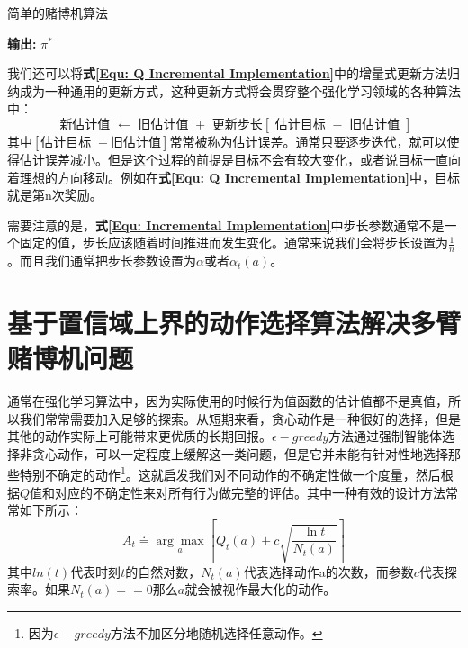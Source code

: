\begin{algorithm}[h]
	\caption{简单的赌博机算法}
	\label{alg: A simple bandit algorithm}
	\begin{algorithmic}[1]
	    \ENDFOR
		
		\ENDWHILE
	\end{algorithmic}
	\hspace*{0.02in} {\bf 输出:} $\pi^{*}$
\end{algorithm}

我们还可以将\textbf{式\eqref{Equ: Q Incremental Implementation}}中的增量式更新方法归纳成为一种通用的更新方式，这种更新方式将会贯穿整个强化学习领域的各种算法中：
\begin{equation}
\label{Equ: Incremental Implementation}
    \text { 新估计值 } \leftarrow \text { 旧估计值 }+\text { 更新步长}[\text { 估计目标 }-\text { 旧估计值 }]
\end{equation}
其中$[\text {估计目标 }-\text {旧估计值}]$常常被称为估计误差。通常只要逐步迭代，就可以使得估计误差减小。但是这个过程的前提是目标不会有较大变化，或者说目标一直向着理想的方向移动。例如在\textbf{式\eqref{Equ: Q Incremental Implementation}}中，目标就是第n次奖励。

需要注意的是，\textbf{式\eqref{Equ: Incremental Implementation}}中步长参数通常不是一个固定的值，步长应该随着时间推进而发生变化。通常来说我们会将步长设置为$\frac{1}{n}$。而且我们通常把步长参数设置为$\alpha$或者$\alpha_{t}(a)$。

\section{基于置信域上界的动作选择算法解决多臂赌博机问题}
通常在强化学习算法中，因为实际使用的时候行为值函数的估计值都不是真值，所以我们常常需要加入足够的探索。从短期来看，贪心动作是一种很好的选择，但是其他的动作实际上可能带来更优质的长期回报。$\epsilon-greedy$方法通过强制智能体选择非贪心动作，可以一定程度上缓解这一类问题，但是它并未能有针对性地选择那些特别不确定的动作\footnote{因为$\epsilon-greedy$方法不加区分地随机选择任意动作。}。这就启发我们对不同动作的不确定性做一个度量，然后根据$Q$值和对应的不确定性来对所有行为做完整的评估。其中一种有效的设计方法常常如下所示：
\begin{equation}
\label{Equ: UCB selection}
    A_{t} \doteq \underset{a}{\arg \max }\left[Q_{t}(a)+c \sqrt{\frac{\ln t}{N_{t}(a)}}\right]
\end{equation}
其中$ln(t)$代表时刻$t$的自然对数，$N_t(a)$代表选择动作a的次数，而参数$c$代表探索率。如果$N_t(a)==0$那么$a$就会被视作最大化的动作。

